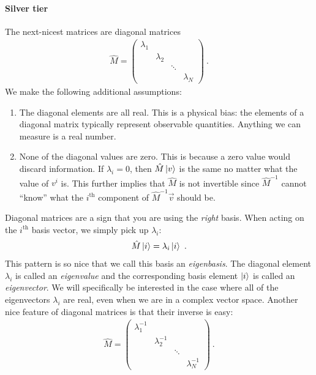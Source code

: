 \documentclass[12pt]{article}
\begin{document}
\paragraph{Silver tier} The next-nicest matrices are diagonal matrices
\begin{align}
\hat M = 
    \begin{pmatrix}
        \lambda_1 & & & \\
         & \lambda_2 & & \\
         & & \ddots & \\
         & & & \lambda_N
    \end{pmatrix} \ .
    \label{eq:diagonal:matrix}
\end{align}
We make the following additional assumptions:
\begin{enumerate}
\item The diagonal elements are all real. This is a physical bias: the elements of a diagonal matrix typically represent observable quantities. Anything we can measure is a real number.
\item None of the diagonal values are zero. This is because a zero value would discard information. If $\lambda_i=0$, then $\hat M\left|v\right\rangle$ is the same no matter what the value of $v^i$ is. This further implies that $\hat M$ is not invertible since $\hat M^{-1}$ cannot ``know'' what the $i^\text{th}$ component of $\hat M^{-1}\vec{v}$ should be. 
\end{enumerate}
Diagonal matrices are a sign that you are using the \emph{right} basis. When acting on the $i^\text{th}$ basis vector, we simply pick up $\lambda_i$:
\begin{align}
    \hat M \left|i\right\rangle = \lambda_i \left|i\right\rangle \ .
\end{align}
This pattern is so nice that we call this basis an \emph{eigenbasis}. The diagonal element $\lambda_i$ is called an \emph{eigenvalue} and the corresponding basis element $\left|i\right\rangle$ is called an \emph{eigenvector}. We will specifically be interested in the case where all of the eigenvectors $\lambda_i$ are real, even when we are in a complex vector space. Another nice feature of diagonal matrices is that their inverse is easy:
\begin{align}
    \hat M = 
        \begin{pmatrix}
        \lambda_1^{-1} & & & \\
         & \lambda_2^{-1} & & \\
         & & \ddots & \\
         & & & \lambda_N^{-1}
    \end{pmatrix} \ .
\end{align}
\end{document}
